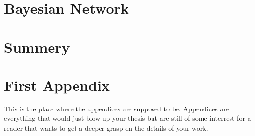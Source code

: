 \documentclass[12pt, a4paper, fleqn]{memoir}%
\begin{document}
\chapter{Bayesian Network}
\label{chap:BayesianNetwork}

\chapter{Summery}
\label{Summery}


{\small}

\appendix
\appendixpage*
\chapter{First Appendix}
\label{app:FirstAppendix}
This is the place where the appendices are supposed to be. Appendices are everything that would just blow up your thesis but are still of some interrest for a reader that wants to get a deeper grasp on the details of your work.

\backmatter
\end{document}
